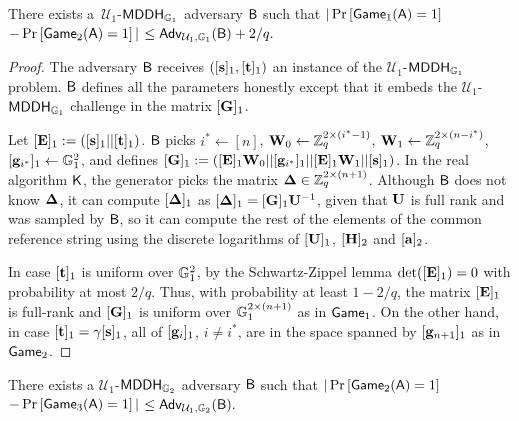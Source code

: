 \begin{lemma} There exists a~$\mathcal{U}_1$-$\mathsf{MDDH}_{\mathbb{G}_1}$ adversary $\mathsf{B}$ such that
$|\Pr\left[\mathsf{Game}_{1}(\mathsf{A})=1\right]$ $-\Pr\left[\mathsf{Game}_{2}(\mathsf{A})=1\right]|$ $\leq
    \mathsf{Adv}_{\mathcal{U}_1,\mathbb{G}_1}(\mathsf{B}) + 2/q.$
\label{lemma:bits2}
\end{lemma}
\begin{proof}
The adversary $\mathsf{B}$ receives $([\mathbf{s}]_1, [\mathbf{t}]_1)$ an instance of the $\mathcal{U}_1$-$\mathsf{MDDH}_{\mathbb{G}_1}$ problem.
$\mathsf{B}$ defines all the parameters honestly except that
it embeds the $\mathcal{U}_1$-$\mathsf{MDDH}_{\mathbb{G}_1}$ challenge in the matrix 
$[\mathbf{{G}}]_1$.

Let $[\mathbf{{E}}]_1:=([\mathbf{s}]_1||[\mathbf{t}]_1)$. $\mathsf{B}$ picks $i^*\gets[n]$, $\mathbf{{W}}_0\gets\mathbb{Z}_q^{2\times(i^*-1)}$,
$\mathbf{{W}}_1\gets\mathbb{Z}_q^{2\times(n-i^*)}$,
$[\mathbf{g}_{i^*}]_1\gets\mathbb{G}_1^{2}$,
and defines $[\mathbf{{G}}]_1 := ([\mathbf{{E}}]_1\mathbf{{W}}_0||[\mathbf{g}_{i^*}]_1||[\mathbf{{E}}]_1\mathbf{{W}}_1|| [\mathbf{s}]_1)$. 
In the real algorithm $\mathsf{K}$, the generator picks the matrix $\mathbf{{\Delta}} \in \mathbb{Z}_q^{2 \times (n+1)}$.
Although $\mathsf{B}$ does not know $\mathbf{{\Delta}}$,  it can compute $[\mathbf{{\Delta}}]_1$ as $[\mathbf{{\Delta}}]_1= [\mathbf{{G}}]_1\mathbf{{U}}^{-1}$,
given that $\mathbf{{U}}$ is full rank and was  sampled 
by $\mathsf{B}$, so it can compute the rest of the elements of the
common reference string  using the discrete logarithms of $[\mathbf{{U}}]_1$, $[{\mathbf{{H}}}]_2$ and $[\mathbf{a}]_2$.  

In case $[\mathbf{t}]_1$ is uniform over $\mathbb{G}_1^{2}$, by the Schwartz-Zippel lemma $\det([\mathbf{{E}}]_1) = 0$ with probability at most $2/q$.
Thus, with probability at least $1-2/q$, the matrix $[\mathbf{{E}}]_1$ is full-rank and $[\mathbf{{G}}]_1$ is uniform over $\mathbb{G}_1^{2\times(n+1)}$ as in
$\mathsf{Game}_1$.
On the other hand, in case $[\mathbf{t}]_1=\gamma [\mathbf{s}]_1$, all of $[\mathbf{g}_{i}]_1$, $i\neq i^*$, are in the space
spanned by $[\mathbf{g}_{n+1}]_1$ as in $\mathsf{Game}_2$.
\end{proof}

\begin{lemma} There exists a $\mathcal{U}_1$-$\mathsf{MDDH}_{\mathbb{G}_2}$ adversary $\mathsf{B}$ such that
$|\Pr\left[\mathsf{Game}_{2}(\mathsf{A})=1\right]$ $-\Pr\left[\mathsf{Game}_{3}(\mathsf{A})=1\right]|$ $\leq
\mathsf{Adv}_{\mathcal{U}_1,\mathbb{G}_2}(\mathsf{B}).$
\label{lemma:bits3}
\end{lemma}

